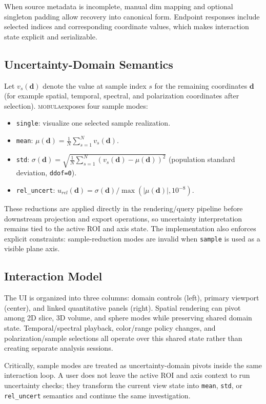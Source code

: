 \documentclass[11pt]{article}
\newcommand{\tool}{\textsc{mobula}}
\begin{document}
When source metadata is incomplete, manual dim mapping and optional singleton padding allow recovery into canonical form. Endpoint responses include selected indices and corresponding coordinate values, which makes interaction state explicit and serializable.

\subsection{Uncertainty-Domain Semantics}
Let $v_s(\mathbf{d})$ denote the value at sample index $s$ for the remaining coordinates $\mathbf{d}$ (for example spatial, temporal, spectral, and polarization coordinates after selection). \tool exposes four sample modes:
\begin{itemize}[leftmargin=1.5em]
  \item \texttt{single}: visualize one selected sample realization.
  \item \texttt{mean}: $\mu(\mathbf{d}) = \frac{1}{N}\sum_{s=1}^{N} v_s(\mathbf{d})$.
  \item \texttt{std}: $\sigma(\mathbf{d}) = \sqrt{\frac{1}{N}\sum_{s=1}^{N}(v_s(\mathbf{d})-\mu(\mathbf{d}))^2}$ (population standard deviation, \texttt{ddof=0}).
  \item \texttt{rel\_uncert}: $u_{rel}(\mathbf{d}) = \sigma(\mathbf{d}) / \max(|\mu(\mathbf{d})|, 10^{-8})$.
\end{itemize}

These reductions are applied directly in the rendering/query pipeline before downstream projection and export operations, so uncertainty interpretation remains tied to the active ROI and axis state. The implementation also enforces explicit constraints: sample-reduction modes are invalid when \texttt{sample} is used as a visible plane axis.

\subsection{Interaction Model}
The UI is organized into three columns: domain controls (left), primary viewport (center), and linked quantitative panels (right). Spatial rendering can pivot among 2D slice, 3D volume, and sphere modes while preserving shared domain state. Temporal/spectral playback, color/range policy changes, and polarization/sample selections all operate over this shared state rather than creating separate analysis sessions.

Critically, sample modes are treated as uncertainty-domain pivots inside the same interaction loop. A user does not leave the active ROI and axis context to run uncertainty checks; they transform the current view state into \texttt{mean}, \texttt{std}, or \texttt{rel\_uncert} semantics and continue the same investigation.
\end{document}
